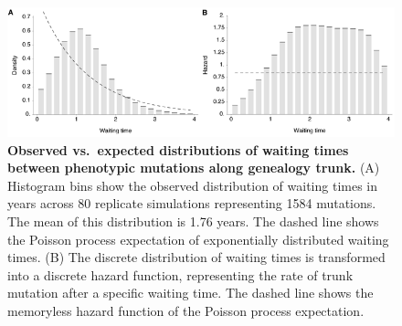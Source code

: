 \pagebreak

\begin{figure}[!c]
	\centering
	\includegraphics{figures/waittimes}
	\caption{\textbf{Observed vs.\ expected distributions of waiting times between phenotypic mutations along genealogy trunk.} (A) Histogram bins show the observed distribution of waiting times in years across 80 replicate simulations representing 1584 mutations.  The mean of this distribution is 1.76 years.  The dashed line shows the Poisson process expectation of exponentially distributed waiting times.  (B) The discrete distribution of waiting times is transformed into a discrete hazard function, representing the rate of trunk mutation after a specific waiting time.  The dashed line shows the memoryless hazard function of the Poisson process expectation.}
	\label{waittimes}
\end{figure}

\pagebreak

